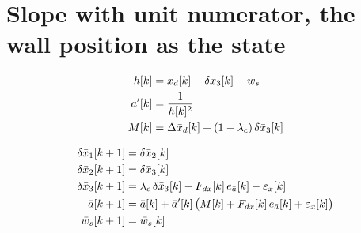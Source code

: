 \clearpage
\section{Slope with unit numerator, the wall position as the state}

\[
\begin{aligned}
h[k] &= \bar{x}_d[k] - \delta\bar{x}_3[k] - \bar{w}_s \\
\bar{a}'[k] &= \frac{1}{h[k]^{2}} \\
M[k] &= \Delta\bar{x}_d[k] + (1-\lambda_c)\,\delta\bar{x}_3[k]
\end{aligned}
\]

\[
\begin{aligned}
\delta\bar{x}_1[k+1] &= \delta\bar{x}_2[k] \\
\delta\bar{x}_2[k+1] &= \delta\bar{x}_3[k] \\
\delta\bar{x}_3[k+1] &= \lambda_c\,\delta\bar{x}_3[k] - F_{dx}[k]\,e_{\bar{a}}[k] - \varepsilon_x[k] \\
\bar{a}[k+1] &= \bar{a}[k] + \bar{a}'[k]\,\big(M[k] + F_{dx}[k]\,e_{\bar{a}}[k] + \varepsilon_x[k]\big) \\
\bar{w}_s[k+1] &= \bar{w}_s[k]
\end{aligned}
\]

